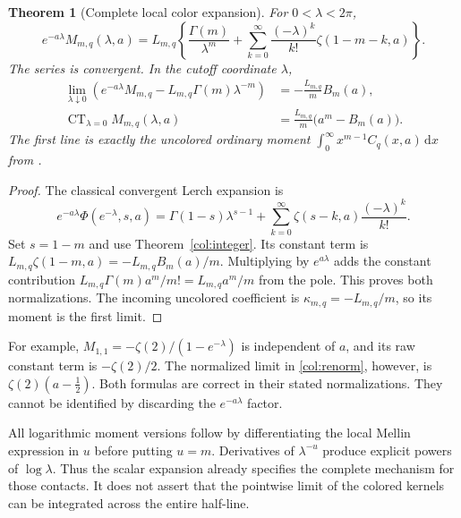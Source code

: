 \documentclass[11pt,a4paper]{article}
\numberwithin{equation}{section}
\newtheorem{theorem}{Theorem}[section]
\theoremstyle{definition}
\theoremstyle{remark}
\DeclareMathOperator{\CT}{CT}
\newcommand{\dd}{\,\mathrm d}
\begin{document}
\begin{theorem}[Complete local color expansion]\label{col:coalescence}
For $0<\lambda<2\pi$,
\begin{equation}\label{col:coalescence-formula}
 \boxed{\displaystyle
 e^{-a\lambda}M_{m,q}(\lambda,a)
 =L_{m,q}\left\{\frac{\Gamma(m)}{\lambda^m}
       +\sum_{k=0}^\infty
             \frac{(-\lambda)^k}{k!}\zeta(1-m-k,a)\right\}.}
\end{equation}
The series is convergent. In the cutoff coordinate $\lambda$,
\begin{align}
 \lim_{\lambda\downarrow0}
 \left(e^{-a\lambda}M_{m,q}
              -L_{m,q}\Gamma(m)\lambda^{-m}\right)
      &=-\frac{L_{m,q}}m B_m(a),\label{col:renorm}\\
 \CT_{\lambda=0}M_{m,q}(\lambda,a)
      &=\frac{L_{m,q}}m\bigl(a^m-B_m(a)\bigr).\label{col:raw-CT}
\end{align}
The first line is exactly the uncolored ordinary moment
$\int_0^\infty x^{m-1}C_q(x,a)\dd x$ from \cite{repobalanced}.
\end{theorem}

\begin{proof}
The classical convergent Lerch expansion \cite[25.14.3\_1]{dlmflerch}
is
\[
 e^{-a\lambda}\Phi(e^{-\lambda},s,a)
    =\Gamma(1-s)\lambda^{s-1}
       +\sum_{k=0}^\infty\zeta(s-k,a)\frac{(-\lambda)^k}{k!}.
\]
Set $s=1-m$ and use Theorem~\ref{col:integer}.
Its constant term is $L_{m,q}\zeta(1-m,a)
=-L_{m,q}B_m(a)/m$.
Multiplying by $e^{a\lambda}$ adds the constant contribution
$L_{m,q}\Gamma(m)a^m/m!=L_{m,q}a^m/m$ from the pole.
This proves both normalizations.
The incoming uncolored coefficient is
$\kappa_{m,q}=-L_{m,q}/m$, so its moment is the first limit.
\end{proof}

For example, $M_{1,1}=-\zeta(2)/(1-e^{-\lambda})$ is independent of
$a$, and its raw constant term is $-\zeta(2)/2$.
The normalized limit in \eqref{col:renorm}, however, is
$\zeta(2)(a-\tfrac12)$. Both formulas are correct in their stated
normalizations. They cannot be identified by discarding the
$e^{-a\lambda}$ factor.

All logarithmic moment versions follow by differentiating the local
Mellin expression in $u$ before putting $u=m$. Derivatives of
$\lambda^{-u}$ produce explicit powers of $\log\lambda$.
Thus the scalar expansion already specifies the complete mechanism
for those contacts. It does not assert that the pointwise limit of
the colored kernels can be integrated across the entire half-line.
\end{document}

